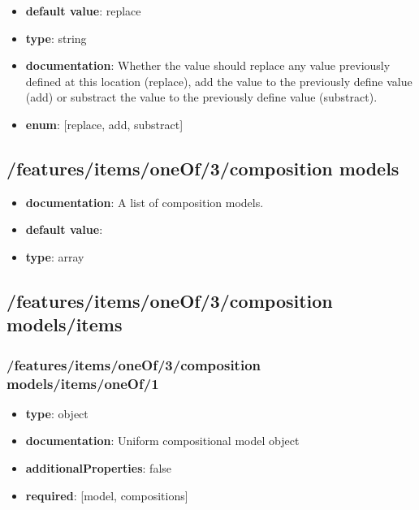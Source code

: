 \begin{itemize}\item {\bf default value}: replace
\item {\bf type}: string
\item {\bf documentation}: Whether the value should replace any value previously defined at this location (replace), add the value to the previously define value (add) or substract the value to the previously define value (substract).
\item {\bf enum}: [replace, add, substract]\end{itemize}\subsection{/features/items/oneOf/3/composition models}
\begin{itemize}\item {\bf documentation}: A list of composition models.
\item {\bf default value}: 
\item {\bf type}: array
\end{itemize}\subsection{/features/items/oneOf/3/composition models/items}

\subsubsection{/features/items/oneOf/3/composition models/items/oneOf/1}
\begin{itemize}\item {\bf type}: object
\item {\bf documentation}: Uniform compositional model object
\item {\bf additionalProperties}: false
\item {\bf required}: [model, compositions]\end{itemize}
